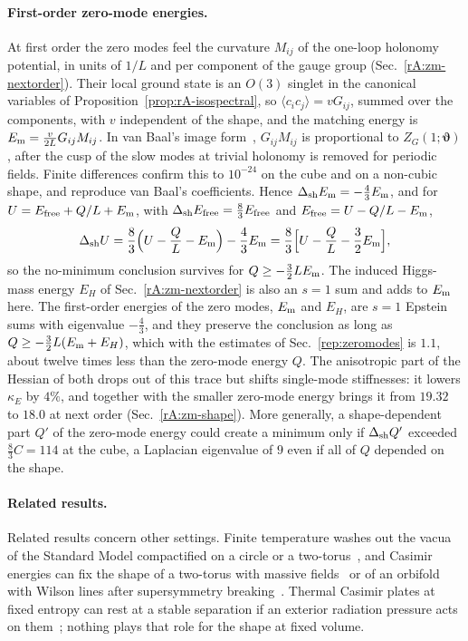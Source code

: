 \paragraph{First-order zero-mode energies.}
At first order the zero modes feel the curvature $M_{ij}$ of the one-loop holonomy potential, in units of $1/L$ and per component of the gauge group (Sec.~\ref{rA:zm-nextorder}).
Their local ground state is an $O(3)$ singlet in the canonical variables of Proposition~\ref{prop:rA-isospectral}, so $\langle c_ic_j\rangle=vG_{ij}$, summed over the components, with $v$ independent of the shape, and the matching energy is $E_{\rm m}=\tfrac{v}{2L}G_{ij}M_{ij}$.
In van Baal's image form~\cite{vanBaal:1988va}, $G_{ij}M_{ij}$ is proportional to $Z_G(1;\bm\vartheta)$, after the cusp of the slow modes at trivial holonomy is removed for periodic fields.
Finite differences confirm this to $10^{-24}$ on the cube and on a non-cubic shape, and reproduce van Baal's coefficients. %
Hence $\Delta_{\mathrm{sh}}E_{\rm m}=-\tfrac43E_{\rm m}$, and for $U=E_{\rm free}+Q/L+E_{\rm m}$, with $\Delta_{\mathrm{sh}}E_{\rm free}=\tfrac83E_{\rm free}$ and $E_{\rm free}=U-Q/L-E_{\rm m}$,
\begin{equation}
\Delta_{\mathrm{sh}}U=\frac83\Big(U-\frac QL-E_{\rm m}\Big)-\frac43E_{\rm m}=\frac83\Big[U-\frac QL-\frac32E_{\rm m}\Big],
\end{equation}
so the no-minimum conclusion survives for $Q\geq-\tfrac32LE_{\rm m}$.
The induced Higgs-mass energy $E_H$ of Sec.~\ref{rA:zm-nextorder} is also an $s=1$ sum and adds to $E_{\rm m}$ here.
The first-order energies of the zero modes, $E_{\rm m}$ and $E_H$, are $s=1$ Epstein sums with eigenvalue $-\tfrac43$, and they preserve the conclusion as long as $Q\geq-\tfrac32L(E_{\rm m}+E_H)$, which with the estimates of Sec.~\ref{rep:zeromodes} is $1.1$, about twelve times less than the zero-mode energy $Q$. %
The anisotropic part of the Hessian of both drops out of this trace but shifts single-mode stiffnesses: it lowers $\kappa_E$ by $4\%$, and together with the smaller zero-mode energy brings it from $19.32$ to $18.0$ at next order (Sec.~\ref{rA:zm-shape}). %
More generally, a shape-dependent part $Q'$ of the zero-mode energy could create a minimum only if $\Delta_{\mathrm{sh}}Q'$ exceeded $\tfrac83C=114$ at the cube, a Laplacian eigenvalue of $9$ even if all of $Q$ depended on the shape. %

\paragraph{Related results.}
Related results concern other settings.
Finite temperature washes out the vacua of the Standard Model compactified on a circle or a two-torus~\cite{Arnold:2011cz}, and Casimir energies can fix the shape of a two-torus with massive fields~\cite{Burikham:2008fg} or of an orbifold with Wilson lines after supersymmetry breaking~\cite{Buchmuller:2009er}.
Thermal Casimir plates at fixed entropy can rest at a stable separation if an exterior radiation pressure acts on them~\cite{Mitter:1999hu}; nothing plays that role for the shape at fixed volume.

